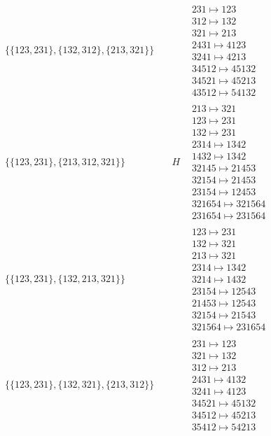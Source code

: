 \begin{tiny}
\begin{align}
\begin{matrix}
\end{matrix}
\\
\{\{123, 231\}, \{132, 312\}, \{213, 321\}\}
\quad
&
\phantom{.}
&
\begin{matrix}
231 \mapsto 123\\312 \mapsto 132\\321 \mapsto 213\\2431 \mapsto 4123\\3241 \mapsto 4213\\34512 \mapsto 45132\\34521 \mapsto 45213\\43512 \mapsto 54132
\end{matrix}
\\
\{\{123, 231\}, \{213, 312, 321\}\}
\quad
&
H
&
\begin{matrix}
213 \mapsto 321\\123 \mapsto 231\\132 \mapsto 231\\2314 \mapsto 1342\\1432 \mapsto 1342\\32145 \mapsto 21453\\32154 \mapsto 21453\\23154 \mapsto 12453\\321654 \mapsto 321564\\231654 \mapsto 231564
\end{matrix}
\\
\{\{123, 231\}, \{132, 213, 321\}\}
\quad
&
\phantom{.}
&
\begin{matrix}
123 \mapsto 231\\132 \mapsto 321\\213 \mapsto 321\\2314 \mapsto 1342\\3214 \mapsto 1432\\23154 \mapsto 12543\\21453 \mapsto 12543\\32154 \mapsto 21543\\321564 \mapsto 231654
\end{matrix}
\\
\{\{123, 231\}, \{132, 321\}, \{213, 312\}\}
\quad
&
\phantom{.}
&
\begin{matrix}
231 \mapsto 123\\321 \mapsto 132\\312 \mapsto 213\\2431 \mapsto 4132\\3241 \mapsto 4123\\34521 \mapsto 45132\\34512 \mapsto 45213\\35412 \mapsto 54213

\end{matrix}
\end{align}
\end{tiny}
